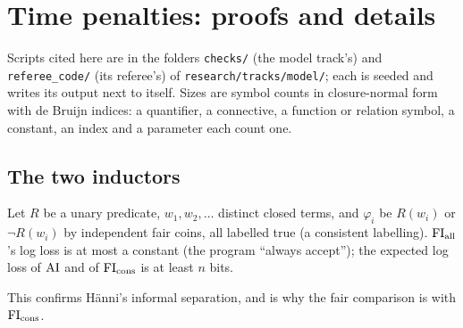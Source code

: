 \section{Time penalties: proofs and details}\label{app:time}

Scripts cited here are in the folders \texttt{checks/} (the model track's) and \texttt{referee\_code/} (its referee's) of \texttt{research/tracks/model/}; each is seeded and writes its output next to itself. Sizes are symbol counts in closure-normal form with de Bruijn indices: a quantifier, a connective, a function or relation symbol, a constant, an index and a parameter each count one.

\subsection{The two inductors}\label{app:time:inducers}

\begin{proposition}\label{prop:time:fiall}
Let $R$ be a unary predicate, $w_1,w_2,\dots$ distinct closed terms, and $\varphi_i$ be $R(w_i)$ or $\neg R(w_i)$ by independent fair coins, all labelled true (a consistent labelling). $\mathrm{FI}_{\mathrm{all}}$'s log loss is at most a constant (the program ``always accept''); the expected log loss of $\mathrm{AI}$ and of $\mathrm{FI}_{\mathrm{cons}}$ is at least $n$ bits.
\end{proposition}

\noindent This confirms H\"anni's informal separation, and is why the fair comparison is with $\mathrm{FI}_{\mathrm{cons}}$.

